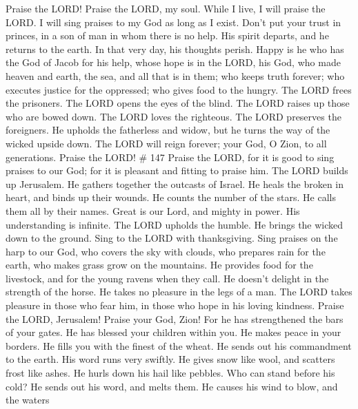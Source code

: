  Praise the LORD! Praise the LORD, my soul. 
While I live, I will praise the LORD. I will sing praises to my God as
long as I exist.  Don't put your trust in princes, in a son
of man in whom there is no help.  His spirit departs, and he
returns to the earth. In that very day, his thoughts perish.
 Happy is he who has the God of Jacob for his help, whose
hope is in the LORD, his God,  who made heaven and earth,
the sea, and all that is in them; who keeps truth forever; 
who executes justice for the oppressed; who gives food to the hungry.
The LORD frees the prisoners.  The LORD opens the eyes of
the blind. The LORD raises up those who are bowed down. The LORD loves
the righteous.  The LORD preserves the foreigners. He
upholds the fatherless and widow, but he turns the way of the wicked
upside down.  The LORD will reign forever; your God, O
Zion, to all generations. Praise the LORD! \# 147  Praise
the LORD, for it is good to sing praises to our God; for it is pleasant
and fitting to praise him.  The LORD builds up Jerusalem. He
gathers together the outcasts of Israel.  He heals the
broken in heart, and binds up their wounds.  He counts the
number of the stars. He calls them all by their names. 
Great is our Lord, and mighty in power. His understanding is infinite.
 The LORD upholds the humble. He brings the wicked down to
the ground.  Sing to the LORD with thanksgiving. Sing
praises on the harp to our God,  who covers the sky with
clouds, who prepares rain for the earth, who makes grass grow on the
mountains.  He provides food for the livestock, and for the
young ravens when they call.  He doesn't delight in the
strength of the horse. He takes no pleasure in the legs of a man.
 The LORD takes pleasure in those who fear him, in those
who hope in his loving kindness.  Praise the LORD,
Jerusalem! Praise your God, Zion!  For he has strengthened
the bars of your gates. He has blessed your children within you.
 He makes peace in your borders. He fills you with the
finest of the wheat.  He sends out his commandment to the
earth. His word runs very swiftly.  He gives snow like
wool, and scatters frost like ashes.  He hurls down his
hail like pebbles. Who can stand before his cold?  He sends
out his word, and melts them. He causes his wind to blow, and the waters
